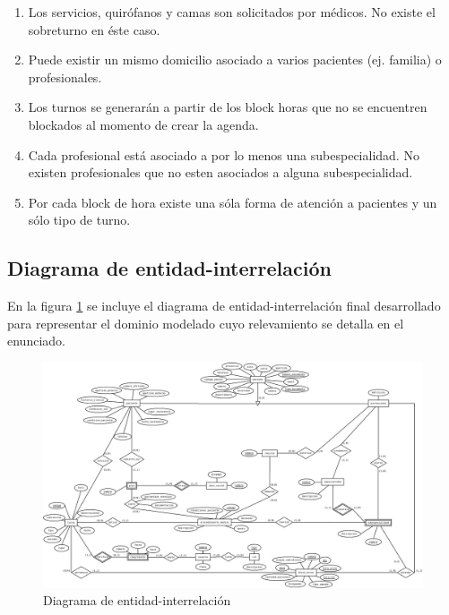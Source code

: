 \documentclass[a4paper,11pt]{article}
\begin{document}
\begin{enumerate}
    \item Los servicios, quirófanos y camas son solicitados por médicos. No existe 
    el sobreturno en éste caso.
    
    \item Puede existir un mismo domicilio asociado a varios pacientes (ej. familia)
    o profesionales.
    
    \item Los turnos se generarán a partir de los block horas que no se encuentren 
    blockados al momento de crear la agenda.
    
    \item Cada profesional está asociado a por lo menos una subespecialidad. No existen 
    profesionales que no esten asociados a alguna subespecialidad.
    
    \item Por cada block de hora existe una sóla forma de atención a pacientes y un 
    sólo tipo de turno.

\end{enumerate}



\subsection{Diagrama de entidad-interrelación}

 En la figura \ref{fig:der} se incluye el diagrama de entidad-interrelación
 final desarrollado para representar el dominio modelado cuyo relevamiento se
 detalla en el enunciado.

\begin{figure}[h!t]
  \centering
  \includegraphics[width=1.4\textwidth, angle=90]{build/images/der.jpeg}
  \caption{Diagrama de entidad-interrelación} \label{fig:der}
\end{figure}
\end{document}
